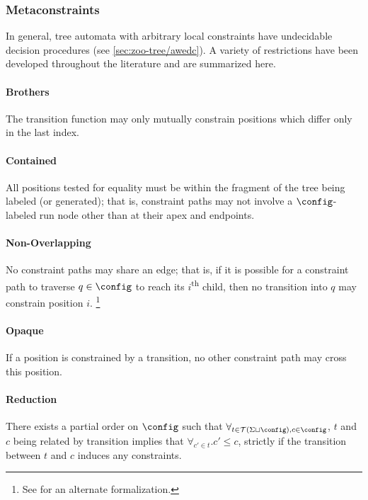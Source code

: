 \subsubsection{Metaconstraints}

In general, tree automata with arbitrary local constraints have undecidable
decision procedures (see \autoref{sec:zoo-tree/awedc}).  A variety of
restrictions have been developed throughout the literature and are
summarized here.

\paragraph{Brothers} The transition function may only mutually constrain
positions which differ only in the last index.

\paragraph{Contained} All positions tested for equality must be within the
fragment of the tree being labeled (or generated); that is, constraint paths
may not involve a $\config$-labeled run node other than at their apex and
endpoints.

\paragraph{Non-Overlapping} No constraint paths may share an edge; that is,
if it is possible for a constraint path to traverse $q \in \config$ to reach
its $i$\textsuperscript{th} child, then no transition into $q$ may constrain
position $i$.%
%
\footnote{See \cite[Exercise 4.8]{tata} for an alternate formalization.}

\paragraph{Opaque} If a position is constrained by a transition, no other
constraint path may cross this position. 

\paragraph{Reduction} There exists a partial order on $\config$ such that
$\forall_{t \in \mathcal{T}(\Sigma \sqcup \config), c \in \config}$, $t$ and
$c$ being related by transition implies that $\forall_{c' \in t} . c' \le
c$, strictly if the transition between $t$ and $c$ induces any constraints.

